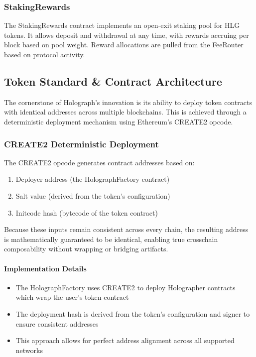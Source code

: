 \documentclass[10pt,a4paper,twocolumn]{article}
\begin{document}
\subsubsection{StakingRewards}
The StakingRewards contract implements an open-exit staking pool for HLG tokens. It allows deposit and withdrawal at any time, with rewards accruing per block based on pool weight. Reward allocations are pulled from the FeeRouter based on protocol activity.

\subsection{Token Standard \& Contract Architecture}
The cornerstone of Holograph's innovation is its ability to deploy token contracts with identical addresses across multiple blockchains. This is achieved through a deterministic deployment mechanism using Ethereum's CREATE2 opcode.

\subsubsection{CREATE2 Deterministic Deployment}
The CREATE2 opcode generates contract addresses based on:
\begin{enumerate}
  \item Deployer address (the HolographFactory contract)
  \item Salt value (derived from the token's configuration)
  \item Initcode hash (bytecode of the token contract)
\end{enumerate}
Because these inputs remain consistent across every chain, the resulting address is mathematically guaranteed to be identical, enabling true crosschain composability without wrapping or bridging artifacts.

\paragraph{Implementation Details}
\begin{itemize}
  \item The HolographFactory uses CREATE2 to deploy Holographer contracts which wrap the user's token contract
  \item The deployment hash is derived from the token's configuration and signer to ensure consistent addresses
  \item This approach allows for perfect address alignment across all supported networks
\end{itemize}
\end{document}
